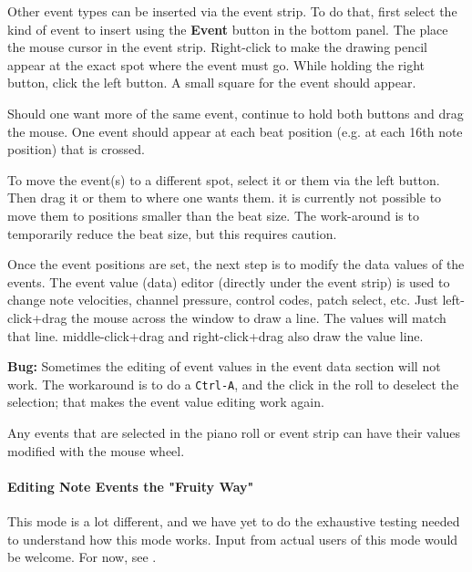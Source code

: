    Other event types can be inserted via the event strip.  To do that, first
   select the kind of event to insert using the \textbf{Event} button in the
   bottom panel.  The place the mouse cursor in the event strip.
   Right-click to make the drawing pencil appear at the exact spot where the
   event must go.  While holding the right button, click the left button.
   A small square for the event should appear.

   Should one want more of the same event, continue to hold both buttons and
   drag the mouse.  One event should appear at each beat position (e.g. at
   each 16th note position) that is crossed.

   To move the event(s) to a different spot, select it or them via the left
   button.  Then drag it or them to where one wants them.
   it is currently not possible to move them to positions smaller than the
   beat size.  The work-around is to temporarily reduce the beat size,
   but this requires caution.

   Once the event positions are set, the next step is to modify the
   data values of the events.
	The event value (data) editor (directly under the event strip) is used 
	to change note velocities, channel pressure, control codes,
	patch select, etc.
   Just left-click+drag the mouse across the window to draw a line.  The
   values will match that line.  
   middle-click+drag and right-click+drag also
   draw the value line.

   \textbf{Bug:}
   Sometimes the editing of event values in the event data section will not work.
   The workaround is to do a \texttt{Ctrl-A}, and the click in the roll
   to deselect the selection; that makes the event value editing work again.
   
   Any events that are selected in the piano roll or event strip can have
   their values modified with the mouse wheel.

\paragraph{Editing Note Events the "Fruity Way"}
\label{paragraph:pattern_editor_note_events_fruity}

   This mode is a lot different, and we have yet to do the exhaustive testing
   needed to understand how this mode works.  Input from actual users of this
   mode would be welcome.
   For now, see .

